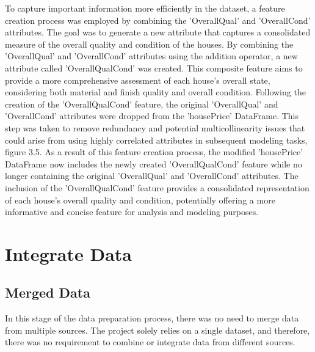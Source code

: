 To capture important information more efficiently in the dataset, a feature creation process was employed by combining the 'OverallQual' and 'OverallCond' attributes. The goal was to generate a new attribute that captures a consolidated measure of the overall quality and condition of the houses. By combining the 'OverallQual' and 'OverallCond' attributes using the addition operator, a new attribute called 'OverallQualCond' was created. This composite feature aims to provide a more comprehensive assessment of each house's overall state, considering both material and finish quality and overall condition.
Following the creation of the 'OverallQualCond' feature, the original 'OverallQual' and 'OverallCond' attributes were dropped from the 'housePrice' DataFrame. This step was taken to remove redundancy and potential multicollinearity issues that could arise from using highly correlated attributes in subsequent modeling tasks, figure 3.5.
As a result of this feature creation process, the modified 'housePrice' DataFrame now includes the newly created 'OverallQualCond' feature while no longer containing the original 'OverallQual' and 'OverallCond' attributes. The inclusion of the 'OverallQualCond' feature provides a consolidated representation of each house's overall quality and condition, potentially offering a more informative and concise feature for analysis and modeling purposes.

\section{Integrate Data}

\subsection{Merged Data}

In this stage of the data preparation process, there was no need to merge data from multiple sources. The project solely relies on a single dataset, and therefore, there was no requirement to combine or integrate data from different sources.

